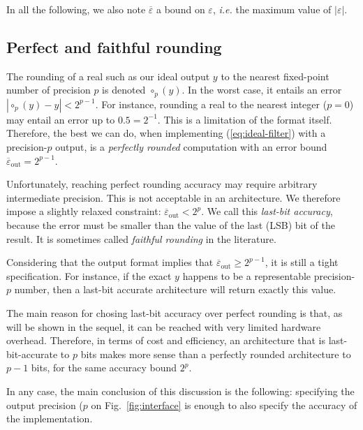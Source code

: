 \documentclass[twocolumn]{IEEEtran}
\newcommand{\abserr}{\varepsilon}
\newcommand{\maxerr}{\bound{\abserr}}
\newcommand{\maxepstotal}{\maxerr_{\text{out}}}
\newcommand{\bound}[1]{\overline{#1}}
\begin{document}
In all the following, we also note  $\maxerr$ a bound on $\abserr$, \emph{i.e.} the maximum value of $|\abserr|$.


\subsection{Perfect and faithful rounding}
The rounding of a real such as our ideal output $y$ to the nearest fixed-point number of precision $p$ is denoted  $\circ_{p}(y)$.
In the worst case, it entails an error  \mbox{$|\circ_{p}(y)-y| < 2^{p-1}$}. 
For instance, rounding a real to the nearest integer ($p=0$) may entail an error up to  $0.5=2^{-1}$.
This is a limitation of the format itself.
Therefore, the best we can do, when implementing (\ref{eq:ideal-filter}) with a precision-$p$ output, is a \emph{perfectly rounded} computation with an error bound $\maxepstotal=2^{p-1}$.


Unfortunately, reaching perfect rounding accuracy may require arbitrary intermediate precision. 
This is not acceptable in an architecture. 
We therefore impose a slightly relaxed constraint:  $\maxepstotal<2^{p}$.
We call this \emph{last-bit accuracy}, because the error must be smaller than the value of the last (LSB) bit of the result.
It is sometimes called \emph{faithful rounding} in the literature.

Considering that the output format implies that $\maxepstotal\ge 2^{p-1}$, it is still a tight specification. 
For instance, if the exact $y$ happens to be a representable precision-$p$ number, then a last-bit accurate architecture will return exactly this value.

The main reason for chosing last-bit accuracy over perfect rounding is that, as will be shown in the sequel, it can be reached with very limited hardware overhead.
Therefore, in terms of cost and efficiency, an architecture that is last-bit-accurate to $p$ bits makes more sense than a perfectly rounded architecture to $p-1$ bits, for the same accuracy bound $2^{p}$.

In any case, the main conclusion of this discussion is the following: specifying the output precision ($p$ on Fig.~\ref{fig:interface} is enough to also specify the accuracy of the implementation.


\end{document}
